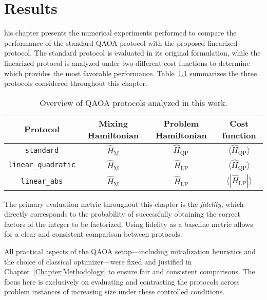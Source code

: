 \chapter{Results}
\label{Chapter:Results}

his chapter presents the numerical experiments performed to compare the performance
of the standard QAOA protocol with the proposed linearized protocol. The standard protocol is
evaluated in its original formulation, while the linearized protocol is analyzed under two different
cost functions to determine which provides the most favorable performance. Table~\ref{tab:protocols_overview}
summarizes the three protocols considered throughout this chapter. 

\begin{table}[h]
    \centering
    \begin{tabular}{@{}cccc@{}}
        \toprule
        Protocol            & Mixing Hamiltonian    & Problem Hamiltonian   & Cost function \\
        \midrule
        \texttt{standard}            & $\hat{H}_\mathrm{M}$   & $\hat{H}_\mathrm{QP}$ & $\langle \hat{H}_\mathrm{QP} \rangle$ \\
        \texttt{linear\_quadratic}   & $\hat{H}_\mathrm{M}$   & $\hat{H}_\mathrm{LP}$ & $\langle \hat{H}_\mathrm{QP} \rangle$ \\
        \texttt{linear\_abs}         & $\hat{H}_\mathrm{M}$   & $\hat{H}_\mathrm{LP}$ & $\langle |\hat{H}_\mathrm{LP}| \rangle$ \\
        \bottomrule
    \end{tabular}
    \caption{Overview of QAOA protocols analyzed in this work.}
    \label{tab:protocols_overview}
\end{table}

The primary evaluation metric throughout this chapter is the \emph{fidelity}, which directly
corresponds to the probability of successfully obtaining the correct factors of the integer
to be factorized. Using fidelity as a baseline metric allows for a clear and consistent
comparison between protocols.

All practical aspects of the QAOA setup---including initialization heuristics and the choice of
classical optimizer---were fixed and justified in Chapter~\ref{Chapter:Methodology} to ensure
fair and consistent comparisons. The focus here is exclusively on evaluating and contrasting
the protocols across problem instances of increasing size under these controlled conditions.

